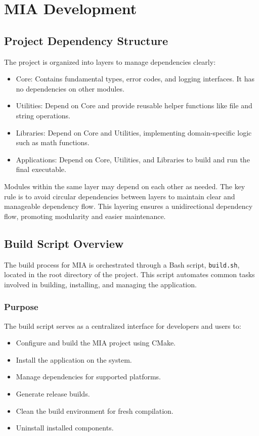 \chapter{MIA Development}
\pagestyle{fancy}






\section{Project Dependency Structure}

The project is organized into layers to manage dependencies clearly:
\begin{itemize}
\item Core: Contains fundamental types, error codes, and logging interfaces. It has no dependencies on other modules.
\item Utilities: Depend on Core and provide reusable helper functions like file and string operations.
\item Libraries: Depend on Core and Utilities, implementing domain-specific logic such as math functions.
\item Applications: Depend on Core, Utilities, and Libraries to build and run the final executable.
\end{itemize}
Modules within the same layer may depend on each other as needed. The key rule is to avoid circular dependencies between layers to maintain clear and manageable dependency flow. This layering ensures a unidirectional dependency flow, promoting modularity and easier maintenance.






\section{Build Script Overview}
\label{sec:build-script}

The build process for MIA is orchestrated through a Bash script, \texttt{build.sh}, located in the root directory of the project. This script automates common tasks involved in building, installing, and managing the application.

\subsection{Purpose}

The build script serves as a centralized interface for developers and users to:
\begin{itemize}
	\item Configure and build the MIA project using CMake.
	\item Install the application on the system.
	\item Manage dependencies for supported platforms.
	\item Generate release builds.
	\item Clean the build environment for fresh compilation.
	\item Uninstall installed components.
\end{itemize}


